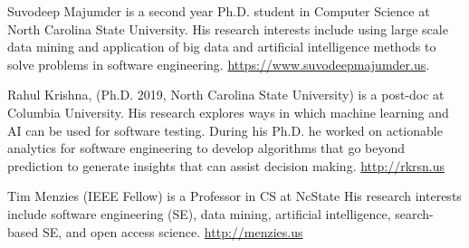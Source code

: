 \documentclass[10pt,journal,compsoc]{IEEEtran}
\begin{document}
\begin{minipage}{.9\linewidth}
\begin{IEEEbiography}{Suvodeep Majumder}
 is a second year Ph.D. student in Computer Science at North Carolina State University.  
  His research interests include using large scale data mining and application of big data and artificial intelligence methods to solve problems in software engineering.
  \url{https://www.suvodeepmajumder.us}.
\end{IEEEbiography}
\begin{IEEEbiography}{Rahul Krishna}, (Ph.D. 2019, North
Carolina State University) is a post-doc at Columbia University.
His research explores ways in which machine learning and AI can be used for software testing.
During his Ph.D. he worked on actionable analytics for software engineering to  develop algorithms that go beyond prediction to generate insights that can assist decision making.   \url{http://rkrsn.us}
\end{IEEEbiography}
\begin{IEEEbiography}{Tim Menzies} (IEEE Fellow)
is a Professor in CS at NcState  His research interests include software engineering (SE), data mining, artificial intelligence, search-based SE, and open access science. \url{http://menzies.us}
\end{IEEEbiography}
\end{minipage}

\newpage

\end{document}
